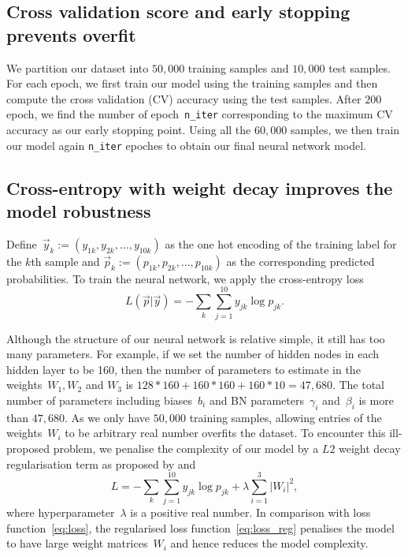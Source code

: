 \subsection{Cross validation score and early stopping prevents overfit\label{sec:early}}
We partition our dataset into $50,000$ training samples and $10,000$ test samples. For each epoch, we first train our model using the training samples and then compute the cross validation (CV) accuracy using the test samples. After $200$ epoch, we find the number of epoch~\texttt{n\_iter} corresponding to the maximum CV accuracy as our early stopping point. Using all the $60,000$ samples, we then train our model again  \texttt{n\_iter} epoches to obtain our final neural network model.

\subsection{Cross-entropy with weight decay improves the model robustness}
Define~$\vec y_k:=(y_{1k},y_{2k},\ldots,y_{10k})$ as the one hot encoding of the training label for the $k$th sample and $\vec p_k:=(p_{1k},p_{2k},\ldots,p_{10k})$ as the corresponding predicted probabilities. To train the neural network, we apply the cross-entropy loss 
\begin{equation}
  {L(\vec p|\vec y)=-\sum_{k}\sum _{j=1}^{10} y_{jk}\log p_{jk}}.  \label{eq:loss}
\end{equation}

Although the structure of our neural network is relative simple, it still has too many parameters. For example, if we set the number of hidden nodes in each hidden layer to be 160, then the number of parameters to estimate in the weights~$W_1,W_2$ and $W_3$ is $128*160+160*160+160*10=47,680$. The total number of parameters including biases~$b_i$ and BN parameters~$\gamma_i$ and~$\beta_i$ is more than $47,680$. As we only have $50,000$ training samples, allowing entries of the weights~$W_i$ to be arbitrary real number overfits the dataset. To encounter this ill-proposed problem, we penalise the complexity of our model by a $L2$ weight decay regularisation term as proposed by \citet{NIPS1991563} and \citet{doi:10.1080/00401706.1970.10488634}
\begin{equation}
  {L=-\sum_k\sum _{j=1}^{10} y_{jk}\log p_{jk}}+\lambda\sum _{i=1}^3\left|W_i\right|^2,  \label{eq:loss_reg}
\end{equation}
where hyperparameter~$\lambda$ is a positive real number.
In comparison with loss function~\eqref{eq:loss}, the regularised loss function~\eqref{eq:loss_reg} penalises the model to have large weight matrices~$W_i$ and hence reduces the model complexity.

